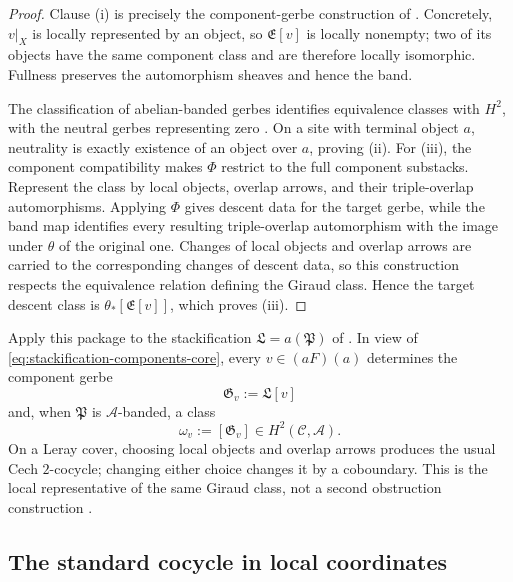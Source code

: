 \begin{proof}
Clause (i) is precisely the component-gerbe construction of
\cite[III, Prop.~2.1.5.3]{Giraud1971}.  Concretely, \(v|_X\) is locally
represented by an object, so \(\mathfrak E[v]\) is locally nonempty; two of
its objects have the same component class and are therefore locally
isomorphic.  Fullness preserves the automorphism sheaves and hence the band.

The classification of abelian-banded gerbes identifies equivalence classes
with \(H^2\), with the neutral gerbes representing zero
\cite[Chap.~IV]{Giraud1971}.  On a site with terminal object \(a\), neutrality
is exactly existence of an object over \(a\), proving (ii).  For (iii), the
component compatibility makes \(\Phi\) restrict to the full component
substacks.  Represent the class by local objects, overlap arrows, and their
triple-overlap automorphisms.  Applying \(\Phi\) gives descent data for the
target gerbe, while the band map identifies every resulting triple-overlap
automorphism with the image under \(\theta\) of the original one.  Changes of
local objects and overlap arrows are carried to the corresponding changes of
descent data, so this construction respects the equivalence relation defining
the Giraud class.  Hence the target descent class is
\(\theta_*[\mathfrak E[v]]\), which proves (iii).
\end{proof}

Apply this package to the stackification
\(\mathfrak L=a(\mathfrak P)\) of .  In view of
\eqref{eq:stackification-components-core}, every
\(v\in(aF)(a)\) determines the component gerbe
\[
 \mathfrak G_v:=\mathfrak L[v]
\]
and, when \(\mathfrak P\) is \(\mathscr A\)-banded, a class
\[
 \omega_v:=[\mathfrak G_v]\in H^2(\mathcal C,\mathscr A).
\]
On a Leray cover, choosing local objects and overlap arrows produces the
usual Cech \(2\)-cocycle; changing either choice changes it by a coboundary.
This is the local representative of the same Giraud class, not a second
obstruction construction \cite{Breen2006,Moerdijk2002}.

\subsection*{The standard cocycle in local coordinates}

